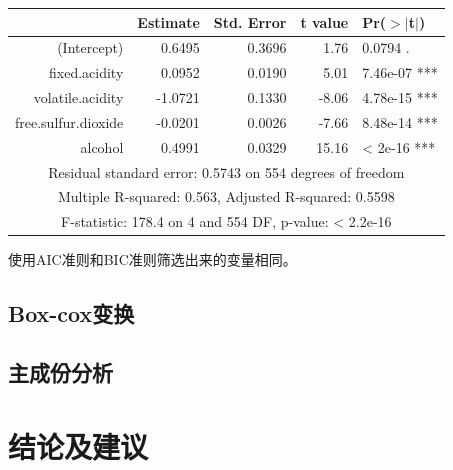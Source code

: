 \documentclass[fontset=ubuntu]{ctexart}
\begin{document}
                \begin{table}[ht]
                    \centering
                    \begin{tabular}{rrrrl}
                        \hline
                        & Estimate & Std. Error & t value & Pr($>$$|$t$|$) \\ 
                        \hline
                        (Intercept) & 0.6495 & 0.3696 & 1.76 & 0.0794 . \\ 
                        fixed.acidity & 0.0952 & 0.0190 & 5.01 & 7.46e-07 *** \\ 
                        volatile.acidity & -1.0721 & 0.1330 & -8.06 & 4.78e-15 *** \\ 
                        free.sulfur.dioxide & -0.0201 & 0.0026 & -7.66 & 8.48e-14 *** \\ 
                        alcohol & 0.4991 & 0.0329 & 15.16 & < 2e-16 *** \\ 
                        \hline
                        \multicolumn{5}{c}{Residual standard error: 0.5743 on 554 degrees of freedom} \\
                        \multicolumn{5}{c}{Multiple R-squared:  0.563,	Adjusted R-squared:  0.5598 } \\
                        \multicolumn{5}{c}{F-statistic: 178.4 on 4 and 554 DF,  p-value: < 2.2e-16} \\
                        \hline
                    \end{tabular}
                \end{table}

                使用AIC准则和BIC准则筛选出来的变量相同。

        \subsection{Box-cox变换}
            
        \subsection{主成份分析}
    \section{结论及建议}

    \newpage
\end{document}
